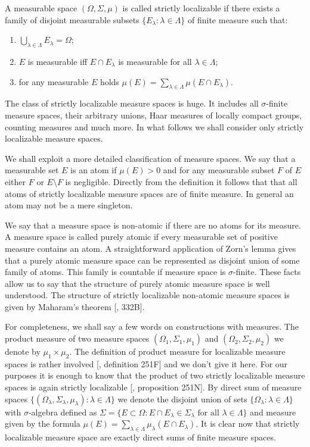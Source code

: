 A measurable space $(\Omega,\Sigma,\mu)$ is called strictly localizable if there
exists a  family of disjoint measurable subsets 
$ \{E_\lambda:\lambda\in\Lambda \}$ of finite measure such that: 
\begin{enumerate}[label = (\roman*)]
  \item $\bigcup_{\lambda\in\Lambda}E_\lambda=\Omega$;

  \item $E$ is measurable iff $E\cap E_\lambda$ is measurable for all
  $\lambda\in\Lambda$;

  \item for any measurable $E$ holds 
  $\mu(E)=\sum_{\lambda\in\Lambda}\mu(E\cap E_\lambda)$. 
\end{enumerate}
  
The class of strictly localizable measure spaces is huge. It includes all
$\sigma$-finite measure spaces, their arbitrary unions, Haar measures of
locally compact groups, counting measures and much more. In what follows we
shall consider only strictly localizable measure spaces.

We shall exploit a more detailed classification of measure spaces. We say that a
measurable set $E$ is an atom if $\mu(E)>0$ and for any measurable subset $F$ of
$E$ either $F$ or $E\setminus F$ is negligible. Directly from the definition it
follows that that all atoms of strictly localizable measure spaces are of finite
measure. In general an atom may not be a mere singleton.

We say that a measure space is non-atomic if there are no atoms for its measure.
A measure space is called purely atomic if every measurable set of positive
measure contains an atom. A straightforward application of Zorn's lemma gives
that a purely atomic measure space can be represented as disjoint union of some
family of atoms. This family is countable if measure space is $\sigma$-finite.
These facts allow us to say that the structure of purely atomic measure space is
well understood. The structure of strictly localizable non-atomic measure spaces
is given by Maharam's theorem [\cite{FremMeasTh}, 332B]. 

For completeness, we shall say a few words on constructions with measures. The
product measure of two measure spaces $(\Omega_1,\Sigma_1,\mu_1)$ and
$(\Omega_2,\Sigma_2,\mu_2)$ we denote by $\mu_1\times \mu_2$. The definition of
product measure for localizable measure spaces is rather involved
[\cite{FremMeasTh}, definition 251F] and we don't give it here.  For our
purposes it is enough to know that the product of two strictly localizable
measure spaces is again strictly localizable [\cite{FremMeasTh}, proposition
251N]. By direct sum of measure spaces $ \{(\Omega_\lambda, \Sigma_\lambda,
\mu_\lambda):\lambda\in\Lambda \}$ we denote the disjoint union of sets 
$\{\Omega_\lambda:\lambda\in\Lambda \}$ with $\sigma$-algebra defined as 
$\Sigma= \{
  E\subset \Omega: E\cap E_\lambda\in\Sigma_\lambda
  \mbox{ for all }\lambda\in\Lambda
 \}$ 
and measure given by the formula 
$\mu(E)=\sum_{\lambda\in\Lambda}\mu_\lambda(E\cap E_\lambda)$. It is clear now
that strictly localizable measure space are exactly direct sums of finite
measure spaces.

